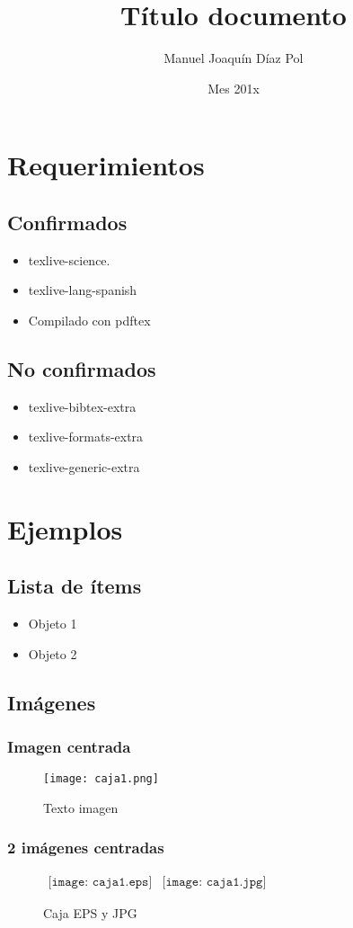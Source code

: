 \documentclass[11pt,spanish]{report}
\title{\textbf{Título documento}}
\author{Manuel Joaquín Díaz Pol}
\date{Mes 201x}
\begin{document}
	\maketitle

	\tableofcontents 

	\chapter{Requerimientos}
		\section{Confirmados}
			\begin{itemize}
				\item texlive-science.
				\item texlive-lang-spanish
				\item Compilado con pdftex
			\end{itemize}
		
		\section{No confirmados}
			\begin{itemize}
				\item texlive-bibtex-extra
				\item texlive-formats-extra
				\item texlive-generic-extra
			\end{itemize}
			
	\chapter{Ejemplos}
		\section{Lista de ítems}
			\begin{itemize}
				\item Objeto 1
				\item Objeto 2
			\end{itemize}
		
		\section{Imágenes}
			\subsection{Imagen centrada}
				\begin{figure}[htp]
					\centering
					\texttt{[image: caja1.png]}
					\caption{Texto imagen}
					\label{}
				\end{figure}
		
			\subsection{2 imágenes centradas}
				\begin{figure}[h]
					\begin{center}$
					\begin{array}{cc}
					\texttt{[image: caja1.eps]} &
					\texttt{[image: caja1.jpg]}
					\end{array}$
					\end{center}
					\caption{Caja EPS y JPG}
				\end{figure}

		
\end{document}
